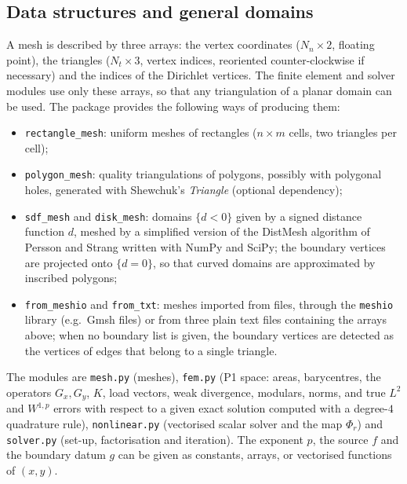 \documentclass[11pt]{amsart}
\theoremstyle{definition}
\theoremstyle{remark}
\numberwithin{equation}{section}
\begin{document}
\subsection{Data structures and general domains}
A mesh is described by three arrays: the vertex coordinates ($N_n\times2$, floating point), the triangles ($N_t\times3$, vertex indices, reoriented counter-clockwise if necessary) and the indices of the Dirichlet vertices. The finite element and solver modules use only these arrays, so that any triangulation of a planar domain can be used. The package provides the following ways of producing them:
\begin{itemize}
\item \texttt{rectangle\_mesh}: uniform meshes of rectangles ($n\times m$ cells, two triangles per cell);
\item \texttt{polygon\_mesh}: quality triangulations of polygons, possibly with polygonal holes, generated with Shewchuk's \emph{Triangle} \cite{Shewchuk} (optional dependency);
\item \texttt{sdf\_mesh} and \texttt{disk\_mesh}: domains $\{d<0\}$ given by a signed distance function $d$, meshed by a simplified version of the DistMesh algorithm of Persson and Strang \cite{PS} written with NumPy \cite{NumPy} and SciPy; the boundary vertices are projected onto $\{d=0\}$, so that curved domains are approximated by inscribed polygons;
\item \texttt{from\_meshio} and \texttt{from\_txt}: meshes imported from files, through the \texttt{meshio} library (e.g.\ Gmsh files) or from three plain text files containing the arrays above; when no boundary list is given, the boundary vertices are detected as the vertices of edges that belong to a single triangle.
\end{itemize}
The modules are \texttt{mesh.py} (meshes), \texttt{fem.py} (P1 space: areas, barycentres, the operators $G_x,G_y$, $K$, load vectors, weak divergence, modulars, norms, and true $L^2$ and $W^{1,p}$ errors with respect to a given exact solution computed with a degree-$4$ quadrature rule), \texttt{nonlinear.py} (vectorised scalar solver and the map $\Phi_r$) and \texttt{solver.py} (set-up, factorisation and iteration). The exponent $p$, the source $f$ and the boundary datum $g$ can be given as constants, arrays, or vectorised functions of $(x,y)$.
\end{document}
